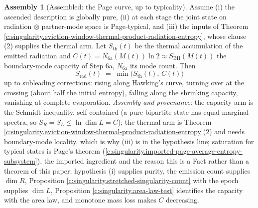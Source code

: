 \documentclass[11pt]{article}
\theoremstyle{definition}
\newtheorem{assembled}[theorem]{Assembly}
\theoremstyle{plain}
\newcommand{\changedmark}[2]{\marginpar{\raggedright\scriptsize\color{#1}#2}}
\providecommand{\Sth}{}\renewcommand{\Sth}{S_{\mathrm{th}}}
\begin{document}
\begin{assembled}[Assembled: the Page curve, up to typicality]\label{c:singularity.assembled-page-curve-up-typicality}
\changedmark{BurntOrange}{changed since the deposit}
Assume (i) the ascended description is globally pure, (ii) at each stage the joint state on radiation $\otimes$ partner-mode space is Page-typical, and (iii) the inputs of Theorem \ref{c:singularity.eviction-window-thermal-product-radiation-entropy}, whose clause (2) supplies the thermal arm. Let $\Sth(t)$ be the thermal accumulation of the emitted radiation and $C(t) = N_{\mathrm{6a}}(M(t))\ln 2 \approx S_{\mathrm{BH}}(M(t))$ the boundary-mode capacity of Step 6a, $N_{\mathrm{6a}}$ its mode count. Then
\[
S_{\mathrm{rad}}(t) \;=\; \min\bigl(\Sth(t),\, C(t)\bigr)
\]
up to subleading corrections: rising along Hawking's curve, turning over at the crossing (about half the initial entropy), falling along the shrinking capacity, vanishing at complete evaporation. \emph{Assembly and provenance:} the capacity arm is the Schmidt inequality, self-contained (a pure bipartite state has equal marginal spectra, so $S_R = S_L \leq \ln\dim L = C$); the thermal arm is Theorem \ref{c:singularity.eviction-window-thermal-product-radiation-entropy}(2) and needs boundary-mode locality, which is why (iii) is in the hypothesis line; saturation for typical states is Page's theorem \cite{Page1993} (\ref{c:singularity.imported-page-average-entropy-subsystem}), the imported ingredient and the reason this is a Fact rather than a theorem of this paper; hypothesis (i) supplies purity, the emission count supplies $\dim R$, Proposition \ref{c:singularity.stretched-singularity-count} with the epoch supplies $\dim L$, Proposition \ref{c:singularity.area-law-test} identifies the capacity with the area law, and monotone mass loss makes $C$ decreasing.
\end{assembled}
\end{document}
